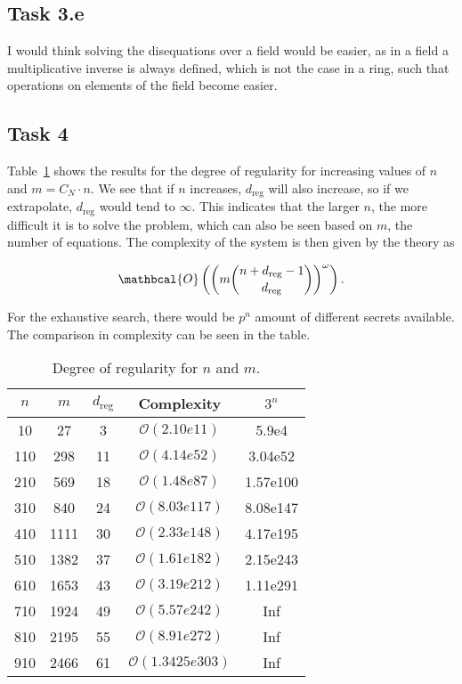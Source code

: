\documentclass{article}
\begin{document}
\subsection*{Task 3.e}

I would think solving the disequations over a field would be easier, as in a
field a multiplicative inverse is always defined, which is not the case in a
ring, such that operations on elements of the field become easier.

\subsection*{Task 4}

Table~\ref{tab:dreg} shows the results for the degree of regularity for
increasing values of $n$ and $m = C_N \cdot n$. We see that if  $n$ increases,
$d_\text{reg}$ will also increase, so if we extrapolate,  $d_\text{reg}$ would
tend to $\infty$. This indicates that the larger $n$, the
more difficult it is to solve the problem, which can also be seen based on $m$,
the number of equations. The complexity of the system is then given by the
theory as 

\begin{equation}
  \mathbcal{O}\left( \left( m {{n + d_\text{reg} - 1}\choose{d_\text{reg}}}
  \right)^\omega  \right) .
\end{equation} 

For the exhaustive search, there would be $p^n$ amount of different secrets
available. The comparison in complexity can be seen in the table.

\begin{table}[h!]
\centering
\caption{Degree of regularity for $n$ and $m$.}
\begin{tabular}{ccccc}
\toprule
$n$ & $m$ & $d_\text{reg}$ & Complexity & $3^n$\\
\midrule
10  & 27   & 3  & $\mathcal{O}\left( 2.10e{11} \right)  $& 5.9e4\\
\midrule
110 & 298  & 11 & $\mathcal{O}\left( 4.14e52 \right)  $& 3.04e52\\
\midrule
210 & 569  & 18 & $\mathcal{O}\left( 1.48e 87 \right)  $& 1.57e100\\
\midrule
310 & 840  & 24 &$\mathcal{O}\left( 8.03e117 \right)  $ & 8.08e147\\
\midrule
410 & 1111 & 30 & $\mathcal{O}\left( 2.33e 148 \right)  $& 4.17e195 \\
\midrule
510 & 1382 & 37 & $\mathcal{O}\left( 1.61 e 182 \right)  $& 2.15e243\\
\midrule
610 & 1653 & 43 & $\mathcal{O}\left( 3.19e 212 \right)  $& 1.11e291 \\
\midrule
710 & 1924 & 49 & $\mathcal{O}\left( 5.57e 242 \right)  $& Inf \\
\midrule
810 & 2195 & 55 & $\mathcal{O}\left( 8.91e 272 \right)  $& Inf \\
\midrule
910 & 2466 & 61 & $\mathcal{O}\left( 1.3425e 303 \right)  $& Inf \\
\end{tabular}
\label{tab:dreg}
\end{table}
\end{document}
